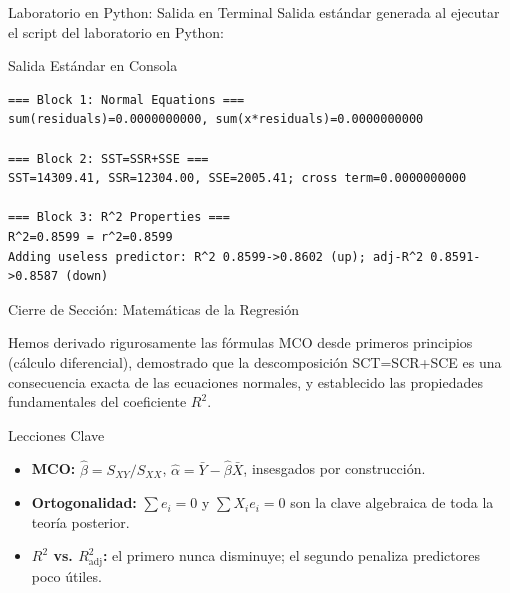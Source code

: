 \documentclass[10pt, aspectratio=169]{beamer}
\begin{document}
\begin{frame}[fragile]{Laboratorio en Python: Salida en Terminal}
  \scriptsize
  Salida estándar generada al ejecutar el script del laboratorio en Python:
  \vspace{0.02cm}
  \begin{block}{Salida Estándar en Consola}
    \fontsize{3.6pt}{4.3pt}\selectfont
    \begin{verbatim}
=== Block 1: Normal Equations ===
sum(residuals)=0.0000000000, sum(x*residuals)=0.0000000000

=== Block 2: SST=SSR+SSE ===
SST=14309.41, SSR=12304.00, SSE=2005.41; cross term=0.0000000000

=== Block 3: R^2 Properties ===
R^2=0.8599 = r^2=0.8599
Adding useless predictor: R^2 0.8599->0.8602 (up); adj-R^2 0.8591->0.8587 (down)
    \end{verbatim}
  \end{block}
\end{frame}

\begin{frame}{Cierre de Sección: Matemáticas de la Regresión}
  \begin{reflexion}
    Hemos derivado rigurosamente las fórmulas MCO desde primeros principios (cálculo diferencial), demostrado que la descomposición SCT=SCR+SCE es una consecuencia exacta de las ecuaciones normales, y establecido las propiedades fundamentales del coeficiente $R^2$.
  \end{reflexion}

  \vspace{0.2cm}
  \pause
  \begin{block}{Lecciones Clave}
    \begin{itemize}\itemsep=0.08cm
      \item \textbf{MCO:} $\hat\beta=S_{XY}/S_{XX}$, $\hat\alpha=\bar Y-\hat\beta\bar X$, insesgados por construcción.
      \item \textbf{Ortogonalidad:} $\sum e_i=0$ y $\sum X_ie_i=0$ son la clave algebraica de toda la teoría posterior.
      \item \textbf{$R^2$ vs. $R^2_{\text{adj}}$:} el primero nunca disminuye; el segundo penaliza predictores poco útiles.
    \end{itemize}
  \end{block}
\end{frame}
\end{document}
